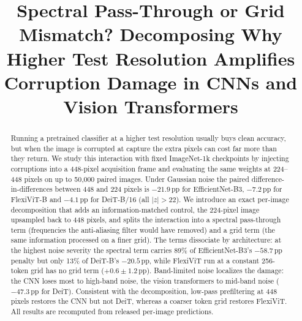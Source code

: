 \documentclass[conference]{IEEEtran}
\newcommand{\pp}{\,\mathrm{pp}}
\begin{document}
\title{Spectral Pass-Through or Grid Mismatch? Decomposing Why Higher Test Resolution Amplifies Corruption Damage in CNNs and Vision Transformers}

\author{\IEEEauthorblockN{[Author 1]}
\and
\IEEEauthorblockN{[Author 2]}
}

\maketitle

\begin{abstract}
Running a pretrained classifier at a higher test resolution usually buys clean accuracy, but when the image is corrupted at capture the extra pixels can cost far more than they return. We study this interaction with fixed ImageNet-1k checkpoints by injecting corruptions into a 448-pixel acquisition frame and evaluating the same weights at 224--448 pixels on up to 50,000 paired images. Under Gaussian noise the paired difference-in-differences between 448 and 224 pixels is $-21.9\pp$ for EfficientNet-B3, $-7.2\pp$ for FlexiViT-B and $-4.1\pp$ for DeiT-B/16 (all $|z|>22$). We introduce an exact per-image decomposition that adds an information-matched control, the 224-pixel image upsampled back to 448 pixels, and splits the interaction into a spectral pass-through term (frequencies the anti-aliasing filter would have removed) and a grid term (the same information processed on a finer grid). The terms dissociate by architecture: at the highest noise severity the spectral term carries 89\% of EfficientNet-B3's $-58.7\pp$ penalty but only 13\% of DeiT-B's $-20.5\pp$, while FlexiViT run at a constant 256-token grid has no grid term ($+0.6\pm1.2\pp$). Band-limited noise localizes the damage: the CNN loses most to high-band noise, the vision transformers to mid-band noise ($-47.3\pp$ for DeiT). Consistent with the decomposition, low-pass prefiltering at 448 pixels restores the CNN but not DeiT, whereas a coarser token grid restores FlexiViT. All results are recomputed from released per-image predictions.
\end{abstract}
\end{document}
